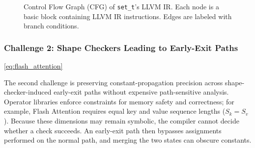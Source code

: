 \begin{figure}[htbp]
\begin{minipage}{0.47\textwidth}
		\caption{Control Flow Graph (CFG) of \texttt{set\_t}'s LLVM IR. Each node is a basic block containing LLVM IR instructions. Edges are labeled with branch conditions.}
		\label{fig:set_t_cfg}
	\end{minipage}
\end{figure}

\color{black}
\subsubsection{Challenge 2: Shape Checkers Leading to Early-Exit Paths}
\leavevmode

{\color{red}%
\autoref{eq:flash_attention}
\par}
{\color{blue}%
The second challenge is preserving constant-propagation precision across shape-checker-induced early-exit paths without expensive path-sensitive analysis. Operator libraries enforce constraints for memory safety and correctness; for example, Flash Attention requires equal key and value sequence lengths ($S_k=S_v$). Because these dimensions may remain symbolic, the compiler cannot decide whether a check succeeds. An early-exit path then bypasses assignments performed on the normal path, and merging the two states can obscure constants.
\par}

